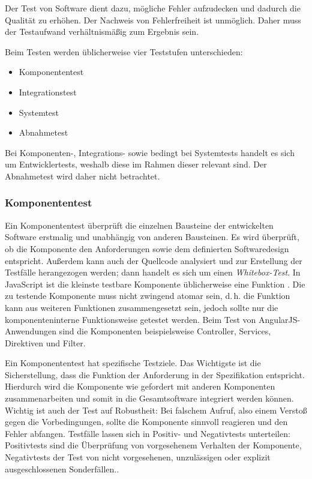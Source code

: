 Der Test von Software dient dazu, mögliche Fehler aufzudecken und dadurch die Qualität zu erhöhen. Der Nachweis von Fehlerfreiheit ist unmöglich. Daher muss der Testaufwand verhältnismäßig zum Ergebnis sein. \cite[][14\psqq]{spillner} 

Beim Testen werden üblicherweise vier Teststufen unterschieden\cite[][42\psq]{spillner}:
\begin{itemize}
	\item Komponententest
	\item Integrationstest
	\item Systemtest
	\item Abnahmetest
\end{itemize}
Bei Komponenten-, Integrations- sowie bedingt bei Systemtests handelt es sich um Entwicklertests, weshalb diese im Rahmen dieser \titleDocument{} relevant sind. Der Abnahmetest wird daher nicht betrachtet.

\subsubsection{Komponententest}
Ein Komponententest überprüft die einzelnen Bausteine der entwickelten Software erstmalig und unabhängig von anderen Bausteinen. Es wird überprüft, ob die Komponente den Anforderungen sowie dem definierten Softwaredesign entspricht. Außerdem kann auch der Quellcode analysiert und zur Erstellung der Testfälle herangezogen werden; dann handelt es sich um einen \textit{Whitebox-Test}.\cite[][44]{spillner} In JavaScript ist die kleinste testbare Komponente üblicherweise eine Funktion \cite{smashing-unit}. Die zu testende Komponente muss nicht zwingend atomar sein, d.\,h. die Funktion kann aus weiteren Funktionen zusammengesetzt sein, jedoch sollte nur die komponenteninterne Funktionsweise getestet werden\cite[][45]{spillner}. Beim Test von AngularJS-Anwendungen sind die Komponenten beispielsweise Controller, Services, Direktiven und Filter.

Ein Komponententest hat spezifische Testziele. Das Wichtigste ist die Sicherstellung, dass die Funktion der Anforderung in der Spezifikation entspricht. Hierdurch wird die Komponente wie gefordert mit anderen Komponenten zusammenarbeiten und somit in die Gesamtsoftware integriert werden können. Wichtig ist auch der Test auf Robustheit: Bei falschem Aufruf, also einem Verstoß gegen die Vorbedingungen, sollte die Komponente sinnvoll reagieren und den Fehler abfangen. Testfälle lassen sich in Positiv- und Negativtests unterteilen: Positivtests sind die Überprüfung von vorgesehenem Verhalten der Komponente, Negativtests der Test von nicht vorgesehenen, unzulässigen oder explizit ausgeschlossenen Sonderfällen.\cite[][48]{spillner}.

